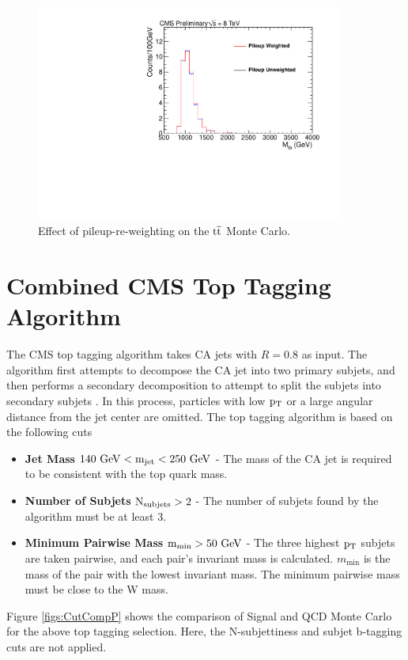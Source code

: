 \begin{figure}[htcb]
\centering
\includegraphics[width=0.9\textwidth]{AN-13-004/figs/TTbar_PileupComp.pdf}
\caption{Effect of pileup-re-weighting on the $\mathrm{t\overline{t}}$ Monte Carlo.}
\label{figs:pileup3ttbar}
\end{figure}



\section{Combined CMS Top Tagging Algorithm}
\label{sec:toptagging}
\label{sec:subjetSF}

The CMS top tagging algorithm takes CA jets with $R = 0.8$ as input.  
The algorithm first attempts to decompose the CA jet into two primary subjets, and then 
performs a secondary decomposition to attempt to split the subjets into secondary subjets \cite{JME13007}.
In this process, particles with low $\mathrm{p_{T}}$ or a large angular distance from the jet center are omitted.
The top tagging algorithm is based on the following cuts

\begin{itemize}
\item {\bf Jet Mass}  $\mathrm{\boldmath 140~\mathrm{GeV} < m_{\text{jet}} < 250~\mathrm{GeV}}$ - The mass of the CA jet is required to be consistent with the top quark mass. 
\item {\bf Number of Subjets}  $\mathrm{\boldmath N_{\text{subjets}} > 2}$ - The number of subjets found by the algorithm must be at least 3.
\item {\bf Minimum Pairwise Mass} $\mathrm{\boldmath m_{\text{min}} > 50~\mathrm{GeV}}$  - The three highest $\mathrm{p_{T}}$ subjets are
taken pairwise, and each pair's invariant mass is calculated. $m_{\text{min}}$ is the mass of the pair with the lowest invariant mass. The minimum pairwise mass must be close to the W mass.   
\end{itemize}
Figure \ref{figs:CutCompP} shows the comparison of Signal and QCD Monte Carlo for the above top tagging selection. Here, the N-subjettiness and subjet b-tagging cuts are not applied.

